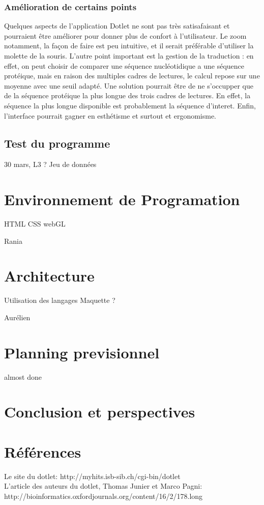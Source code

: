 \documentclass{report}
\begin{document}
\subsection{Amélioration de certains points}
Quelques aspects de l'application Dotlet ne sont pas très satisafaisant et pourraient être améliorer pour donner plus de confort à l'utilisateur. Le zoom notamment, la façon de faire est peu intuitive, et il serait préférable d'utiliser la molette de la souris. L'autre point important est la gestion de la traduction : en effet, on peut choisir de comparer une séquence nucléotidique a une séquence protéique, mais en raison des multiples cadres de lectures, le calcul repose sur une moyenne avec une seuil adapté. Une solution pourrait être de ne s'occupper que de la séquence protéique la plus longue des trois cadres de lectures. En effet, la séquence la plus longue disponible est probablement la séquence d'interet. Enfin, l'interface pourrait gagner en esthétisme et surtout et ergonomisme.

\section{Test du programme}

30 mars, L3 ?
Jeu de données

\chapter{Environnement de Programation}
HTML
CSS
webGL

Rania

\chapter{Architecture}
Utilisation des langages
Maquette ?

Aurélien


\chapter{Planning previsionnel}
almost done



\chapter*{Conclusion et perspectives}


\chapter*{Références}
Le site du dotlet: http://myhits.isb-sib.ch/cgi-bin/dotlet\\
L'article des auteurs du dotlet, Thomas Junier et Marco Pagni: http://bioinformatics.oxfordjournals.org/content/16/2/178.long\\
\end{document}
